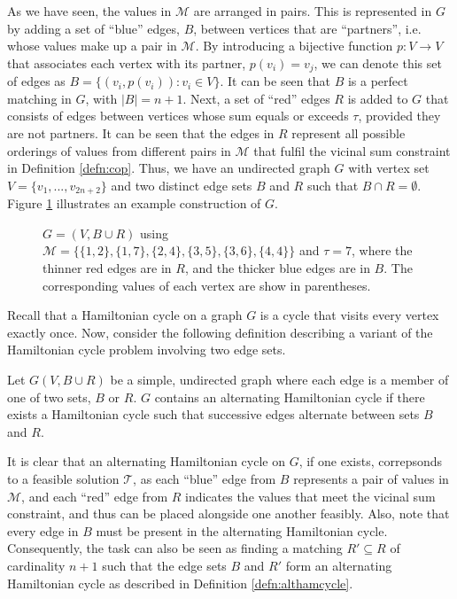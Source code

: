 \documentclass[runningheads]{llncs}
\begin{document}
As we have seen, the values in $\mathcal{M}$ are arranged in pairs. This is represented in $G$ by adding a set of ``blue'' edges, $B$, between vertices that are ``partners'', i.e. whose values make up a pair in $\mathcal{M}$. By introducing a bijective function $p: V \to V$ that associates each vertex with its partner, $p(v_i) = v_j$, we can denote this set of edges as $B = \{(v_i, p(v_i)) : v_i \in V\}$. It can be seen that $B$ is a perfect matching in $G$, with $|B| = n+1$. Next, a set of ``red'' edges $R$ is added to $G$ that consists of edges between vertices whose sum equals or exceeds $\tau$, provided they are not partners. It can be seen that the edges in $R$ represent all possible orderings of values from different pairs in $\mathcal{M}$ that fulfil the vicinal sum constraint in Definition \ref{defn:cop}. Thus, we have an undirected graph $G$ with vertex set $V = \{v_1, ..., v_{2n+2}\}$ and two distinct edge sets $B$ and $R$ such that $B \cap R = \emptyset$. Figure \ref{fig:threshold} illustrates an example construction of $G$. 
\begin{figure}[h!]	
\centering
	
	\caption{$G = (V, B \cup R)$ using $\mathcal{M} = \{\{1,2\}, \{1,7\}, \{2,4\}, \{3,5\}, \{3,6\}, \{4,4\}\}$ and $\tau = 7$, where the thinner red edges are in $R$, and the thicker blue edges are in $B$. The corresponding values of each vertex are show in parentheses.}
	\label{fig:threshold}
\end{figure}

\noindent Recall that a Hamiltonian cycle on a graph $G$ is a cycle that visits every vertex exactly once. Now, consider the following definition describing a variant of the Hamiltonian cycle problem involving two edge sets.

\begin{definition}
	\label{defn:althamcycle}
	Let $G(V, B\cup R)$ be a simple, undirected graph where each edge is a member of one of two sets, $B$ or $R$. $G$ contains an alternating Hamiltonian cycle if there exists a Hamiltonian cycle such that successive edges alternate between sets $B$ and $R$.
\end{definition}

\noindent It is clear that an alternating Hamiltonian cycle on $G$, if one exists, correpsonds to a feasible solution $\mathcal{T}$, as each ``blue'' edge from $B$ represents a pair of values in $\mathcal{M}$, and each ``red'' edge from $R$ indicates the values that meet the vicinal sum constraint, and thus can be placed alongside one another feasibly. Also, note that every edge in $B$ must be present in the alternating Hamiltonian cycle. Consequently, the task can also be seen as finding a matching $R' \subseteq R$ of cardinality $n+1$ such that the edge sets $B$ and $R'$ form an alternating Hamiltonian cycle as described in Definition \ref{defn:althamcycle}. 
\end{document}
